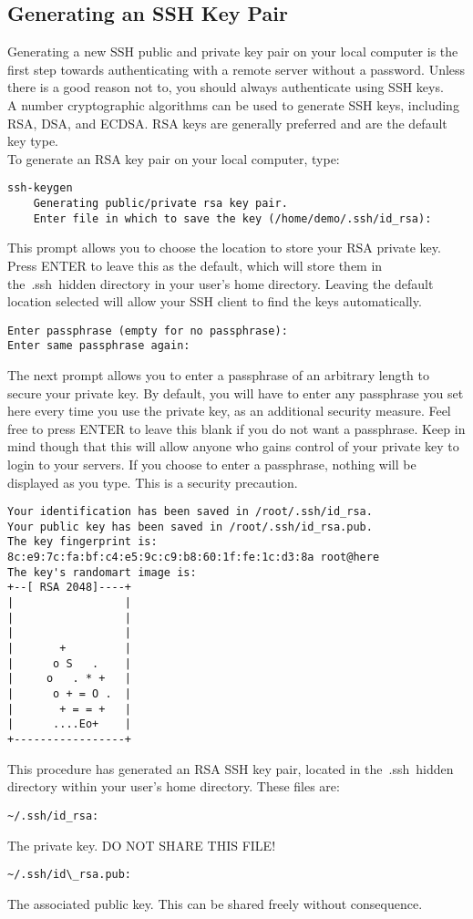 \documentclass[12pt]{report}
\begin{document}
\subsection{Generating an SSH Key Pair}
Generating a new SSH public and private key pair on your local computer is the
first step towards authenticating with a remote server without a password.
Unless there is a good reason not to, you should always authenticate using SSH
keys.\\
A number cryptographic algorithms can be used to generate SSH keys,
including RSA, DSA, and ECDSA. RSA keys are generally preferred and are the
default key type.\\
To generate an RSA key pair on your local computer, type:
\begin{lstlisting}
ssh-keygen
    Generating public/private rsa key pair.
    Enter file in which to save the key (/home/demo/.ssh/id_rsa):
\end{lstlisting}
This prompt allows you to choose the location to store your RSA private key. Press ENTER to leave this as the default, which will store them in the .ssh hidden directory in your user's home directory. Leaving the default location selected will allow your SSH client to find the keys automatically.
\begin{lstlisting}
Enter passphrase (empty for no passphrase):
Enter same passphrase again:
\end{lstlisting} 
The next prompt allows you to enter a passphrase of an arbitrary length to secure your private key. By default, you will have to enter any passphrase you set here every time you use the private key, as an additional security measure. Feel free to press ENTER to leave this blank if you do not want a passphrase. Keep in mind though that this will allow anyone who gains control of your private key to login to your servers.
If you choose to enter a passphrase, nothing will be displayed as you type. This is a security precaution.\\
\begin{lstlisting} 
Your identification has been saved in /root/.ssh/id_rsa.
Your public key has been saved in /root/.ssh/id_rsa.pub.
The key fingerprint is:
8c:e9:7c:fa:bf:c4:e5:9c:c9:b8:60:1f:fe:1c:d3:8a root@here
The key's randomart image is:
+--[ RSA 2048]----+
|                 |
|                 |
|                 |
|       +         |
|      o S   .    |
|     o   . * +   |
|      o + = O .  |
|       + = = +   |
|      ....Eo+    |
+-----------------+
\end{lstlisting} 
This procedure has generated an RSA SSH key pair, located in the .ssh hidden directory within your user's home directory. These files are:
\begin{lstlisting} 
~/.ssh/id_rsa: 
\end{lstlisting} 
The private key. DO NOT SHARE THIS FILE!
\begin{lstlisting}  
~/.ssh/id\_rsa.pub: 
\end{lstlisting}  
The associated public key. This can be shared freely without consequence.
\end{document}
